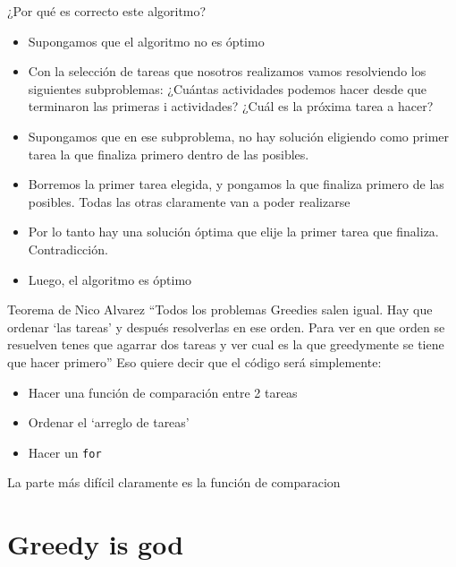 \documentclass{beamer}
\begin{document}
\begin{frame}{¿Por qué es correcto este algoritmo?}
  \begin{itemize}
  \item Supongamos que el algoritmo no es óptimo
  \item Con la selección de tareas que nosotros realizamos vamos
    resolviendo los siguientes subproblemas: ¿Cuántas actividades
    podemos hacer desde que terminaron las primeras i actividades?
    ¿Cuál es la próxima tarea a hacer?
  \item Supongamos que en ese subproblema, no hay solución eligiendo
    como primer tarea la que finaliza primero dentro de las posibles.
  \item Borremos la primer tarea elegida, y pongamos la que finaliza
    primero de las posibles. Todas las otras claramente van a poder
    realizarse
  \item Por lo tanto hay una solución óptima que elije la primer tarea que
    finaliza. Contradicción.
  \item Luego, el algoritmo es óptimo
  \end{itemize}
\end{frame}

\begin{frame}{Teorema de Nico Alvarez}
  ``Todos los problemas Greedies salen igual. Hay que ordenar `las
  tareas' y después resolverlas en ese orden. Para ver en que orden se
  resuelven tenes que agarrar dos tareas y ver cual es la que
  greedymente se tiene que hacer primero''\pause
  Eso quiere decir que el código será simplemente:
  \begin{itemize}
  \item Hacer una función de comparación entre 2 tareas
  \item Ordenar el `arreglo de tareas'
  \item Hacer un \texttt{for}
  \end{itemize}
  La parte más difícil claramente es la función de comparacion
\end{frame}


\section{Greedy is god}
\end{document}
